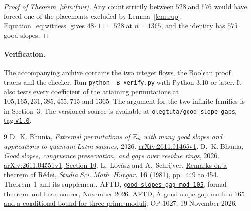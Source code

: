 \begin{proof}[Proof of Theorem~\ref{thm:four}]
Any count strictly between $528$ and $576$ would have forced one of the placements excluded by Lemma~\ref{lem:rup}. Equation~\eqref{eq:witness} gives $48\cdot11=528$ at $n=1365$, and the identity has $576$ good slopes.
\end{proof}

\paragraph{Verification.}
The accompanying archive contains the two integer flows, the Boolean proof traces and the checker. Run \texttt{python -B verify.py} with Python 3.10 or later. It also tests every coefficient of the attaining permutations at $105,165,231,385,455,715$ and $1365$. The argument for the two infinite families is in Section~3. The versioned source is available at \href{https://github.com/olegtuta/good-slope-gaps/tree/v1.0}{\texttt{olegtuta/good-slope-gaps}, tag \texttt{v1.0}}.

\begin{thebibliography}{9}
 D.~K. Bhunia, \emph{Extremal permutations of $\mathbb Z_n$ with many good slopes and applications to quantum Latin squares}, 2026. \href{https://arxiv.org/abs/2611.01465v1}{arXiv:2611.01465v1}.
 D.~K. Bhunia, \emph{Good slopes, congruence preservation, and gaps over residue rings}, 2026. \href{https://arxiv.org/html/2611.04551v1#S10}{arXiv:2611.04551v1, Section 10}.
 L.~Lov\'asz and A.~Schrijver, \href{https://ir.cwi.nl/pub/10047}{Remarks on a theorem of R\'edei}, \emph{Studia Sci. Math. Hungar.} \textbf{16} (1981), pp.~449 to 454. Theorem~1 and its supplement.
 AFTD, \href{https://rainwangphy.github.io/aftd-platform/d/good_slopes_gap_mod_105/}{\texttt{good\_slopes\_gap\_mod\_105}}, formal theorem and Lean source, November 2026.
 AFTD, \href{https://rainwangphy.github.io/aftd-platform/blog/2026-11-19-op-1027/}{A good-slope gap modulo 165 and a conditional bound for three-prime moduli}, OP-1027, 19 November 2026.
\end{thebibliography}
